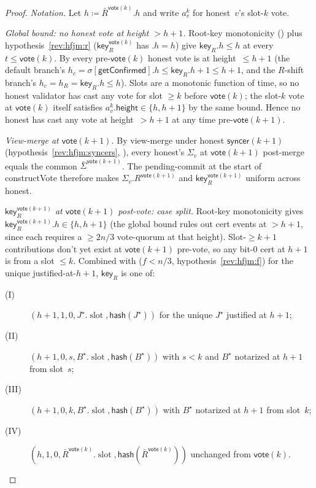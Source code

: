 \ifx\litemode\undefined\documentclass{article}\fi
\newcommand{\slot}[0]{\ensuremath{\operatorname{\mathrm{slot}}}}
\newcommand{\height}{\mathsf{height}}
\newcommand{\hash}{\mathsf{hash}}
\newcommand{\key}{\mathsf{key}}
\newcommand{\syncer}{\mathsf{syncer}}
\newcommand{\vote}{\mathsf{vote}}
\newcommand{\comm}[1]{\bar{#1}}
\newcommand{\constructVote}{\textsf{constructVote}\xspace}
\newcommand{\getConfirmed}{\textsf{getConfirmed}\xspace}
\theoremstyle{plain}
\theoremstyle{definition}
\theoremstyle{remark}
\begin{document}
\begin{proof}
\emph{Notation.}
Let $h \coloneqq \comm{R}^{\vote(k)}.h$ and write $a^k_v$ for honest~$v$'s slot-$k$ vote.

\emph{Global bound: no honest vote at height $> h+1$.}
Root-key monotonicity () plus hypothesis~\ref{rev:hfjm:r} ($\key_R^{\vote(k)}$ has $.h = h$) give $\key_R.h \leq h$ at every $t \leq \vote(k)$. By  every pre-$\vote(k)$ honest vote is at height~$\leq h+1$ (the default branch's $h_c = \sigma[\getConfirmed].h \leq \key_R.h + 1 \leq h+1$, and the $R$-shift branch's $h_c = h_R = \key_R.h \leq h$). Slots are a monotonic function of time, so no honest validator has cast any vote for slot $\geq k$ before $\vote(k)$; the slot-$k$ vote at $\vote(k)$ itself satisfies $a^k_v.\height \in \{h, h+1\}$ by the same bound. Hence no honest has cast any vote at height~$> h+1$ at any time pre-$\vote(k+1)$.

\emph{View-merge at $\vote(k+1)$.}
By view-merge under honest $\syncer(k+1)$ (hypothesis~\ref{rev:hfjm:syncers}, ), every honest's $\Sigma_v$ at $\vote(k+1)$ post-merge equals the common $\comm{\Sigma}^{\vote(k+1)}$. The pending-commit at the start of \constructVote{} therefore makes $\Sigma_v.R^{\vote(k+1)}$ and $\key_R^{\vote(k+1)}$ uniform across honest.

\emph{$\key_R^{\vote(k+1)}$ at $\vote(k+1)$ post-vote: case split.}
Root-key monotonicity gives $\key_R^{\vote(k+1)}.h \in \{h, h+1\}$ (the global bound rules out cert events at $> h+1$, since each requires a $\geq 2n/3$ vote-quorum at that height). Slot-$\geq k+1$ contributions don't yet exist at $\vote(k+1)$ pre-vote, so any bit-$0$ cert at $h+1$ is from a slot $\leq k$. Combined with  ($f<n/3$, hypothesis~\ref{rev:hfjm:f}) for the unique justified-at-$h+1$, $\key_R$ is one of:
\begin{description}
  \item[(I)] $(h+1, 1, 0, J^\star.\slot, \hash(J^\star))$ for the unique $J^\star$ justified at $h+1$;
  \item[(II)] $(h+1, 0, s, B^\star.\slot, \hash(B^\star))$ with $s < k$ and $B^\star$ notarized at $h+1$ from slot~$s$;
  \item[(III)] $(h+1, 0, k, B^\star.\slot, \hash(B^\star))$ with $B^\star$ notarized at $h+1$ from slot~$k$;
  \item[(IV)] $(h, 1, 0, \comm{R}^{\vote(k)}.\slot, \hash(\comm{R}^{\vote(k)}))$ unchanged from $\vote(k)$.
\end{description}


\end{proof}
\end{document}
